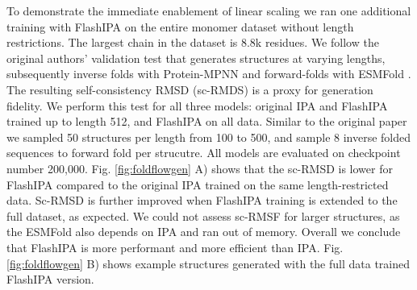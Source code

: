 \documentclass{article}
\begin{document}
To demonstrate the immediate enablement of linear scaling we ran one additional training with FlashIPA on the entire monomer dataset without length restrictions. The largest chain in the dataset is 8.8k residues. 
We follow the original authors' validation test that generates structures at varying lengths, subsequently inverse folds with Protein-MPNN \cite{dauparas2022robust} and forward-folds with ESMFold \cite{lin2022language}. The resulting self-consistency RMSD (sc-RMDS) is a proxy for generation fidelity. We perform this test for all three models: original IPA and FlashIPA trained up to length 512, and FlashIPA on all data. Similar to the original paper we sampled 50 structures per length from 100 to 500, and sample 8 inverse folded sequences to forward fold per strucutre. All models are evaluated on checkpoint number 200,000. Fig. \ref{fig:foldflowgen} A) shows that the sc-RMSD is lower for FlashIPA compared to the original IPA trained on the same length-restricted data. Sc-RMSD is further improved when FlashIPA training is extended to the full dataset, as expected. We could not assess sc-RMSF for larger structures, as the ESMFold also depends on IPA and ran out of memory. Overall we conclude that FlashIPA is more performant and more efficient than IPA. Fig. \ref{fig:foldflowgen} B) shows example structures generated with the full data trained FlashIPA version. 
\end{document}
